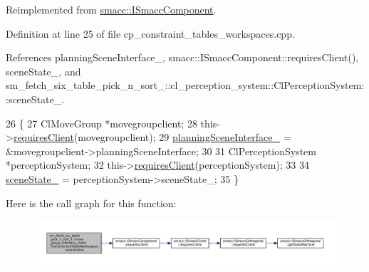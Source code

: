 Reimplemented from \hyperlink{classsmacc_1_1ISmaccComponent_ae6f71d008db12553912e9436184b9e65}{smacc\+::\+I\+Smacc\+Component}.



Definition at line 25 of file cp\+\_\+constraint\+\_\+tables\+\_\+workspaces.\+cpp.



References planning\+Scene\+Interface\+\_\+, smacc\+::\+I\+Smacc\+Component\+::requires\+Client(), scene\+State\+\_\+, and sm\+\_\+fetch\+\_\+six\+\_\+table\+\_\+pick\+\_\+n\+\_\+sort\+\_\+::cl\+\_\+perception\+\_\+system\+::\+Cl\+Perception\+System\+::scene\+State\+\_\+.


\begin{DoxyCode}
26         \{
27             ClMoveGroup *movegroupclient;
28             this->\hyperlink{classsmacc_1_1ISmaccComponent_a36c085d906fbae0fcaee817aaeafebf4}{requiresClient}(movegroupclient);
29             \hyperlink{classsm__fetch__six__table__pick__n__sort__1_1_1move__group__interface__client_1_1CpConstraintTableWorkspaces_a20662ef09bbd5c94f6ec8b0ee8a6231b}{planningSceneInterface\_} = &movegroupclient->planningSceneInterface;
30 
31             ClPerceptionSystem *perceptionSystem;
32             this->\hyperlink{classsmacc_1_1ISmaccComponent_a36c085d906fbae0fcaee817aaeafebf4}{requiresClient}(perceptionSystem);
33 
34             \hyperlink{classsm__fetch__six__table__pick__n__sort__1_1_1move__group__interface__client_1_1CpConstraintTableWorkspaces_ab2dff81f5735a98cffd13a4141d79e33}{sceneState\_} = perceptionSystem->sceneState\_;
35         \}
\end{DoxyCode}
Here is the call graph for this function\+:
\nopagebreak
\begin{figure}[H]
\begin{center}
\leavevmode
\includegraphics[width=350pt]{classsm__fetch__six__table__pick__n__sort__1_1_1move__group__interface__client_1_1CpConstraintTableWorkspaces_a07f404b48f6e94f9cdf0a01eef460d64_cgraph}
\end{center}
\end{figure}
\mbox{\label{classsm__fetch__six__table__pick__n__sort__1_1_1move__group__interface__client_1_1CpConstraintTableWorkspaces_a135da93bbac81518b8551f39221ce47f}} 
